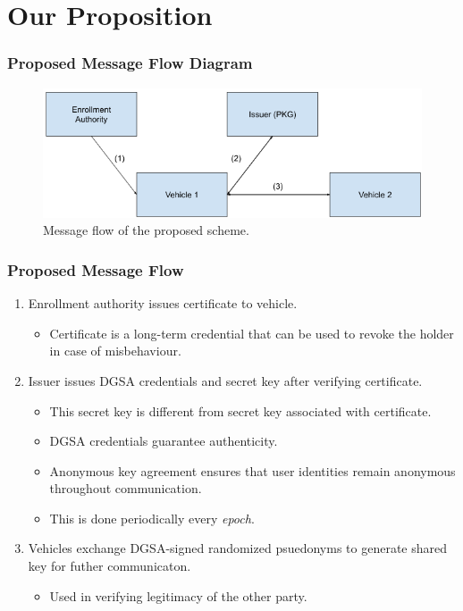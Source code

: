 \documentclass{beamer}
\begin{document}
    \section{Our Proposition}
    \begin{frame}
        \frametitle{Proposed Message Flow Diagram}
        \begin{figure}
            \centering
            \includegraphics[width=\columnwidth]{figs/flow.png}
            \caption{Message flow of the proposed scheme.}
            \label{fig:new-flow}
        \end{figure}
    \end{frame}

    \begin{frame}
        \frametitle{Proposed Message Flow}
        \begin{enumerate}
            \item<1-> Enrollment authority issues certificate to vehicle.
            \begin{itemize}
                \item Certificate is a long-term credential that can be used to
                revoke the holder in case of misbehaviour.
            \end{itemize}
            \item<2-> Issuer issues DGSA credentials and secret key after
            verifying certificate.
            \begin{itemize}
                \item This secret key is different from secret key associated
                with certificate.
                \item DGSA credentials guarantee authenticity.
                \item Anonymous key agreement ensures that user identities
                remain anonymous throughout communication.
                \item This is done periodically every \emph{epoch}.
            \end{itemize}
            \item<3-> Vehicles exchange DGSA-signed randomized psuedonyms to
            generate shared key for futher communicaton.
            \begin{itemize}
                \item Used in verifying legitimacy of the other party.
            \end{itemize}
        \end{enumerate}
    \end{frame}
\end{document}
